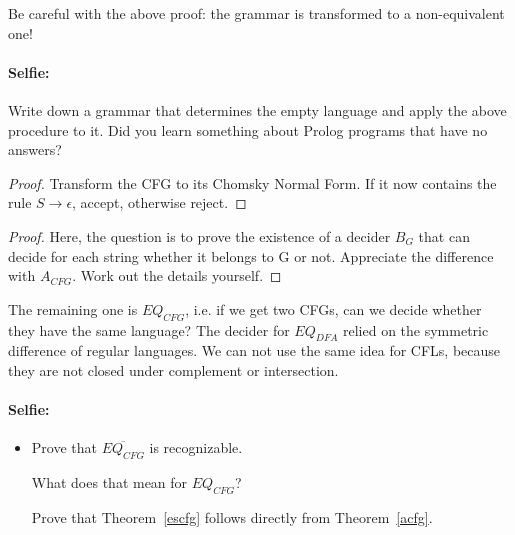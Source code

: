 Be careful with the above proof: the grammar is transformed to a
non-equivalent one!


\paragraph{Selfie:}
Write down a grammar that determines the empty language and apply the
above procedure to it. Did you learn something about Prolog programs
that have no answers?


\begin{proof}
Transform the CFG to its Chomsky Normal Form. If it now contains the
rule $S \rightarrow \epsilon$, accept, otherwise reject.
\end{proof}


\begin{proof}
Here, the question is to prove the existence of a decider $B_G$ that
can decide for each string whether it belongs to G or not. Appreciate
the difference with $A_{CFG}$. Work out the details yourself.
\end{proof} 

The remaining one is $EQ_{CFG}$, i.e. if we get two CFGs, can we
decide whether they have the same language? The decider for $EQ_{DFA}$
relied on the symmetric difference of regular languages. We can not
use the same idea for CFLs, because they are not closed under
complement or intersection.

\paragraph{Selfie:}
\begin{itemize}
\item[]
Prove that $\overline{EQ_{CFG}}$ is recognizable.

What does that mean for $EQ_{CFG}$?

Prove that Theorem~\ref{escfg} follows directly from Theorem~\ref{acfg}.
\end{itemize}



